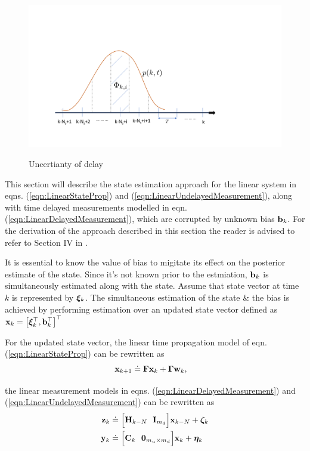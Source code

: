\begin{figure}
	{\includegraphics[trim={2.0cm 2.5cm 6.0cm 6.0cm},clip, width=\columnwidth]{./img/delay_uncertainty.png}}
	\caption{Uncertianty of delay}
	\label{fig:delay_uncertainty}
\end{figure}

This section will describe the state estimation approach for the linear system in eqns. (\ref{eqn:LinearStateProp}) and (\ref{eqn:LinearUndelayedMeasurement}), along with time delayed measurements modelled in eqn. (\ref{eqn:LinearDelayedMeasurement}), which are corrupted by unknown bias $\mathbf{b}_k$. 
For the derivation of the approach described in this section the reader is advised to refer to Section IV in \cite{choi2012state}.

It is essential to know the value of bias to migitate its effect on the posterior estimate of the state. Since it's not known prior to the estmiation, $\mathbf{b}_k$ is simultaneously estimated along with the state. 
Assume that state vector at time $k$ is represented by $\boldsymbol{\xi}_k$.
The simultaneous estimation of the state \& the bias is achieved by performing estimation over an updated state vector defined as $\mathbf{x}_k =	\big[\boldsymbol{\xi}_k^\top, \mathbf{b}_k^\top \big]^\top$


For the updated state vector, the linear time propagation model of eqn. (\ref{eqn:LinearStateProp}) can be rewritten as
\begin{align}
	\label{eqn:LinearStateProp4UpdatedState}
	\mathbf{x}_{k+1} &\doteq \mathbf{F} \mathbf{x}_k + \boldsymbol{\Gamma} \mathbf{w}_k,
\end{align}

the linear measurement models in eqns. (\ref{eqn:LinearDelayedMeasurement}) and (\ref{eqn:LinearUndelayedMeasurement}) can be rewritten as
\begin{align}
	\label{eqn:LinearDelayedMeasurement4UpdatedState}
	\mathbf{z}_k &\doteq \Big[ \mathbf{H}_{k-N} \ \ \mathbf{I}_{m_d} \Big] \mathbf{x}_{k-N} +\boldsymbol{\zeta}_k \\
	\label{eqn:LinearUndelayedMeasurement4UpdatedState}
	\mathbf{y}_k &\doteq \Big[ \mathbf{C}_k \ \ \boldsymbol{0}_{m_u \times m_d} \Big] \mathbf{x}_k + \boldsymbol{\eta}_k
\end{align}



